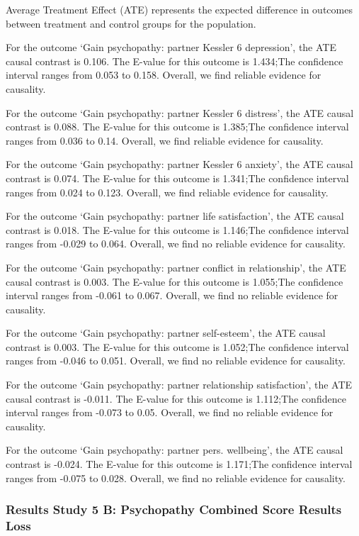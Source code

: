 \documentclass[
  singlecolumn]{article}
\begin{document}
Average Treatment Effect (ATE) represents the expected difference in
outcomes between treatment and control groups for the population.

For the outcome `Gain psychopathy: partner Kessler 6 depression', the
ATE causal contrast is 0.106. The E-value for this outcome is 1.434;The
confidence interval ranges from 0.053 to 0.158. Overall, we find
reliable evidence for causality.

For the outcome `Gain psychopathy: partner Kessler 6 distress', the ATE
causal contrast is 0.088. The E-value for this outcome is 1.385;The
confidence interval ranges from 0.036 to 0.14. Overall, we find reliable
evidence for causality.

For the outcome `Gain psychopathy: partner Kessler 6 anxiety', the ATE
causal contrast is 0.074. The E-value for this outcome is 1.341;The
confidence interval ranges from 0.024 to 0.123. Overall, we find
reliable evidence for causality.

For the outcome `Gain psychopathy: partner life satisfaction', the ATE
causal contrast is 0.018. The E-value for this outcome is 1.146;The
confidence interval ranges from -0.029 to 0.064. Overall, we find no
reliable evidence for causality.

For the outcome `Gain psychopathy: partner conflict in relationship',
the ATE causal contrast is 0.003. The E-value for this outcome is
1.055;The confidence interval ranges from -0.061 to 0.067. Overall, we
find no reliable evidence for causality.

For the outcome `Gain psychopathy: partner self-esteem', the ATE causal
contrast is 0.003. The E-value for this outcome is 1.052;The confidence
interval ranges from -0.046 to 0.051. Overall, we find no reliable
evidence for causality.

For the outcome `Gain psychopathy: partner relationship satisfaction',
the ATE causal contrast is -0.011. The E-value for this outcome is
1.112;The confidence interval ranges from -0.073 to 0.05. Overall, we
find no reliable evidence for causality.

For the outcome `Gain psychopathy: partner pers. wellbeing', the ATE
causal contrast is -0.024. The E-value for this outcome is 1.171;The
confidence interval ranges from -0.075 to 0.028. Overall, we find no
reliable evidence for causality.

\subsubsection{Results Study 5 B: Psychopathy Combined Score Results
Loss}\label{results-study-5-b-psychopathy-combined-score-results-loss}
\end{document}
